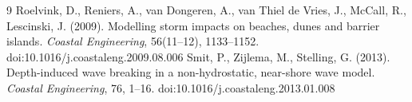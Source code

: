 \documentclass[11pt,a4paper]{article}
\begin{document}
\begin{thebibliography}{9}
 Roelvink, D., Reniers, A., van Dongeren, A., van Thiel de Vries, J., McCall, R.,
Lescinski, J. (2009). Modelling storm impacts on beaches, dunes and barrier islands. \textit{Coastal
Engineering}, 56(11--12), 1133--1152. doi:10.1016/j.coastaleng.2009.08.006
 Smit, P., Zijlema, M., Stelling, G. (2013). Depth-induced wave breaking in a
non-hydrostatic, near-shore wave model. \textit{Coastal Engineering}, 76, 1--16.
doi:10.1016/j.coastaleng.2013.01.008
\end{thebibliography}
\end{document}
